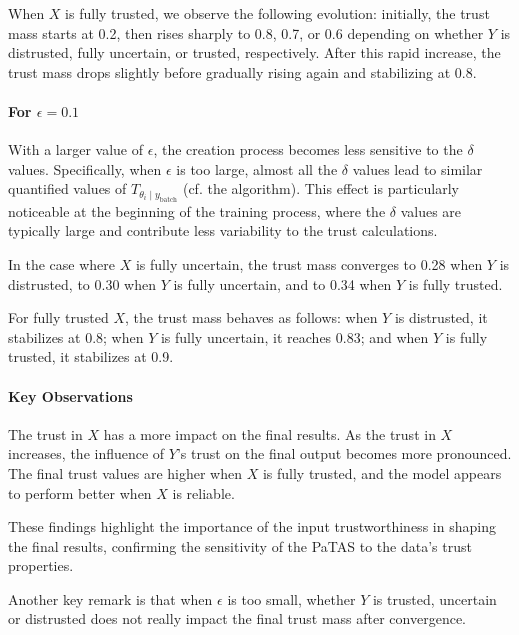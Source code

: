 When \(X\) is fully trusted, we observe the following evolution: initially, the trust mass starts at 0.2, then rises sharply to 0.8, 0.7, or 0.6 depending on whether \(Y\) is distrusted, fully uncertain, or trusted, respectively. After this rapid increase, the trust mass drops slightly before gradually rising again and stabilizing at 0.8.

\paragraph{For \(\epsilon = 0.1\)}
With a larger value of \(\epsilon\), the creation process becomes less sensitive to the \(\delta\) values. Specifically, when \(\epsilon\) is too large, almost all the \(\delta\) values lead to similar quantified values of \(T_{\theta_i \mid y_{\text{batch}}}\) (cf. the algorithm). This effect is particularly noticeable at the beginning of the training process, where the \(\delta\) values are typically large and contribute less variability to the trust calculations.

In the case where \(X\) is fully uncertain, the trust mass converges to 0.28 when \(Y\) is distrusted, to 0.30 when \(Y\) is fully uncertain, and to 0.34 when \(Y\) is fully trusted.

For fully trusted \(X\), the trust mass behaves as follows: when \(Y\) is distrusted, it stabilizes at 0.8; when \(Y\) is fully uncertain, it reaches 0.83; and when \(Y\) is fully trusted, it stabilizes at 0.9.

\paragraph{Key Observations} 
The trust in \(X\) has a more impact on the final results. As the trust in \(X\) increases, the influence of \(Y\)'s trust on the final output becomes more pronounced. The final trust values are higher when \(X\) is fully trusted, and the model appears to perform better when \(X\) is reliable.

These findings highlight the importance of the input trustworthiness in shaping the final results, confirming the sensitivity of the PaTAS to the data’s trust properties.

Another key remark is that when \(\epsilon\) is too small, whether \(Y\) is trusted, uncertain or distrusted does not really impact the final trust mass after convergence.


